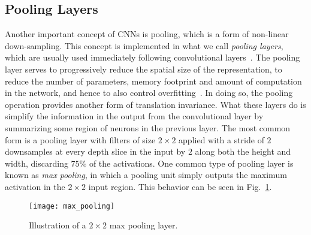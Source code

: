 \documentclass[../main.tex]{subfiles}
\begin{document}
\subsection{Pooling Layers}
Another important concept of CNNs is pooling, which is a form of non-linear
down-sampling.
%
This concept is implemented in what we call \emph{pooling layers}, which are
usually used immediately following convolutional layers~\cite{hinton_2006}.
%
The pooling layer serves to progressively reduce the spatial size of the
representation, to reduce the number of parameters, memory footprint and amount
of computation in the network, and hence to also control
overfitting~\cite{scherer2010evaluation,2014arXiv1412.6806S}.
%
In doing so, the pooling operation provides another form of translation
invariance.
%
What these layers do is simplify the information in the output from the
convolutional layer by summarizing some region of neurons in the previous
layer.
%
The most common form is a pooling layer with filters of size $2\times2$ applied
with a stride of $2$ downsamples at every depth slice in the input by $2$ along
both the height and width, discarding $75\%$ of the activations.
%
One common type of pooling layer is known as \emph{max pooling}, in which a
pooling unit simply outputs the maximum activation in the $2\times2$ input
region.
%
This behavior can be seen in Fig.~\ref{fig:max_pool}.
%
\begin{figure}[htpb]
  \centering
  \texttt{[image: max\_pooling]}
  \caption{Illustration of a $2\times2$ max pooling layer.}%
\label{fig:max_pool}
\end{figure}
%
\end{document}
